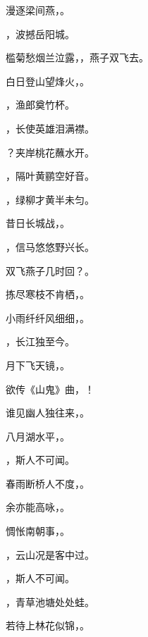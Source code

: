 \documentclass[12pt, a4paper, addpoints]{exam}
\begin{document}
\begin{questions}
\question[1] 漫逐梁间燕，\uline{\qquad\qquad\qquad}。

\question[1] \uline{\qquad\qquad\qquad}，波撼岳阳城。

\question[1] 槛菊愁烟兰泣露，\uline{\qquad\qquad\qquad}，燕子双飞去。

\question[1] 白日登山望烽火，\uline{\qquad\qquad\qquad}。

\question[1] \uline{\qquad\qquad\qquad}，渔郎奠竹杯。

\question[1] \uline{\qquad\qquad\qquad}，长使英雄泪满襟。

\question[1] \uline{\qquad\qquad\qquad}？夹岸桃花蘸水开。

\question[1] \uline{\qquad\qquad\qquad}，隔叶黄鹂空好音。

\question[1] \uline{\qquad\qquad\qquad}，绿柳才黄半未匀。

\question[1] 昔日长城战，\uline{\qquad\qquad\qquad}。

\question[1] \uline{\qquad\qquad\qquad}，信马悠悠野兴长。

\question[1] 双飞燕子几时回？\uline{\qquad\qquad\qquad}。

\question[1] 拣尽寒枝不肯栖，\uline{\qquad\qquad\qquad}。

\question[1] 小雨纤纤风细细，\uline{\qquad\qquad\qquad}。

\question[1] \uline{\qquad\qquad\qquad}，长江独至今。

\question[1] 月下飞天镜，\uline{\qquad\qquad\qquad}。

\question[1] 欲传《山鬼》曲，\uline{\qquad\qquad\qquad}！

\question[1] 谁见幽人独往来，\uline{\qquad\qquad\qquad}。

\question[1] 八月湖水平，\uline{\qquad\qquad\qquad}。

\question[1] \uline{\qquad\qquad\qquad}，斯人不可闻。

\question[1] 春雨断桥人不度，\uline{\qquad\qquad\qquad}。

\question[1] 余亦能高咏，\uline{\qquad\qquad\qquad}。

\question[1] 惆怅南朝事，\uline{\qquad\qquad\qquad}。

\question[1] \uline{\qquad\qquad\qquad}，云山况是客中过。

\question[1] \uline{\qquad\qquad\qquad}，斯人不可闻。

\question[1] \uline{\qquad\qquad\qquad}，青草池塘处处蛙。

\question[1] 若待上林花似锦，\uline{\qquad\qquad\qquad}。


\end{questions}
\end{document}
